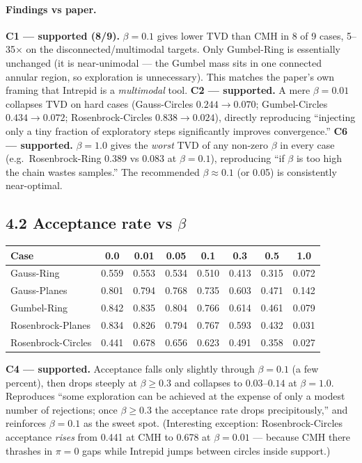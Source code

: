 \documentclass[11pt]{article}
\begin{document}
\paragraph{Findings vs paper.}
\textbf{C1 --- supported (8/9).} $\beta{=}0.1$ gives lower TVD than CMH in
8 of 9 cases, 5--35$\times$ on the disconnected/multimodal targets. Only
Gumbel-Ring is essentially unchanged (it is near-unimodal --- the Gumbel mass
sits in one connected annular region, so exploration is unnecessary). This
matches the paper's own framing that Intrepid is a \emph{multimodal} tool.
\textbf{C2 --- supported.} A mere $\beta{=}0.01$ collapses TVD on hard cases
(Gauss-Circles $0.244 \to 0.070$; Gumbel-Circles $0.434 \to 0.072$;
Rosenbrock-Circles $0.838 \to 0.024$), directly reproducing ``injecting only
a tiny fraction of exploratory steps significantly improves convergence.''
\textbf{C6 --- supported.} $\beta{=}1.0$ gives the \emph{worst} TVD of any
non-zero $\beta$ in every case (e.g.\ Rosenbrock-Ring $0.389$ vs $0.083$ at
$\beta{=}0.1$), reproducing ``if $\beta$ is too high the chain wastes
samples.'' The recommended $\beta \approx 0.1$ (or 0.05) is consistently
near-optimal.

\subsection*{4.2 Acceptance rate vs $\beta$}

\begin{center}
\small
\begin{tabular}{lccccccc}
\toprule
Case & 0.0 & 0.01 & 0.05 & 0.1 & 0.3 & 0.5 & 1.0 \\
\midrule
Gauss-Ring         & 0.559 & 0.553 & 0.534 & 0.510 & 0.413 & 0.315 & 0.072 \\
Gauss-Planes       & 0.801 & 0.794 & 0.768 & 0.735 & 0.603 & 0.471 & 0.142 \\
Gumbel-Ring        & 0.842 & 0.835 & 0.804 & 0.766 & 0.614 & 0.461 & 0.079 \\
Rosenbrock-Planes  & 0.834 & 0.826 & 0.794 & 0.767 & 0.593 & 0.432 & 0.031 \\
Rosenbrock-Circles & 0.441 & 0.678 & 0.656 & 0.623 & 0.491 & 0.358 & 0.027 \\
\bottomrule
\end{tabular}
\end{center}

\textbf{C4 --- supported.} Acceptance falls only slightly through
$\beta{=}0.1$ (a few percent), then drops steeply at $\beta \ge 0.3$ and
collapses to $0.03$--$0.14$ at $\beta{=}1.0$. Reproduces ``some exploration
can be achieved at the expense of only a modest number of rejections; once
$\beta \ge 0.3$ the acceptance rate drops precipitously,'' and reinforces
$\beta{=}0.1$ as the sweet spot. (Interesting exception: Rosenbrock-Circles
acceptance \emph{rises} from 0.441 at CMH to 0.678 at $\beta{=}0.01$ ---
because CMH there thrashes in $\pi{=}0$ gaps while Intrepid jumps between
circles inside support.)
\end{document}
